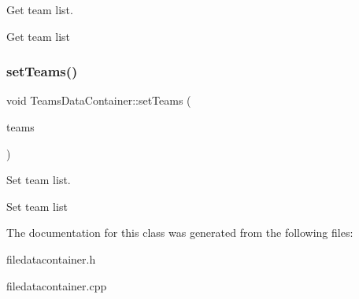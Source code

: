 Get team list. 

Get team list \mbox{\label{classTeamsDataContainer_ad548ee4d3ac8d05fdb4f99d159cb41cd}} 
\subsubsection{\texorpdfstring{setTeams()}{setTeams()}}
{\footnotesize\ttfamily void Teams\+Data\+Container\+::set\+Teams (\begin{DoxyParamCaption}\item[{std\+::vector$<$ \mbox{\hyperlink{classTeamDataContainer}{Team\+Data\+Container}} $>$}]{teams }\end{DoxyParamCaption})}



Set team list. 

Set team list 

The documentation for this class was generated from the following files\+:\begin{DoxyCompactItemize}
\item 
filedatacontainer.\+h\item 
filedatacontainer.\+cpp\end{DoxyCompactItemize}
